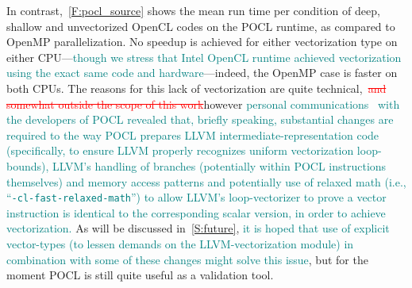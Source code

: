 \documentclass[12pt,number,sort&compress,preprint]{elsarticle}
\newcommand{\add}[1]{{\sloppy\textcolor{teal}{#1}}}  %
\newcommand{\delete}[1]{\sloppy\textcolor{red}{\sout{#1}}} %
\begin{document}
In contrast,~\cref{F:pocl_source} shows the mean run time per condition of deep, shallow and unvectorized OpenCL codes on the POCL runtime, as compared to OpenMP parallelization.
No speedup is achieved for either vectorization type on either CPU---\add{though we stress that Intel OpenCL runtime achieved vectorization using the exact same code and hardware}---indeed, the OpenMP case is faster on both CPUs.
The reasons for this lack of vectorization are quite technical,~\delete{and somewhat outside the scope of this work}however \add{personal communications~\cite{pocl_communication} with the developers of POCL revealed that, briefly speaking, substantial changes are required to the way POCL prepares LLVM intermediate-representation code (specifically, to ensure LLVM properly recognizes uniform vectorization loop-bounds), LLVM's handling of branches (potentially within POCL instructions themselves) and memory access patterns and potentially use of relaxed math (i.e., ``\texttt{-cl-fast-relaxed-math}'') to allow LLVM's loop-vectorizer to prove a vector instruction is identical to the corresponding scalar version, in order to achieve vectorization.}
As will be discussed in~\cref{S:future}, \add{it is hoped that use of explicit vector-types (to lessen demands on the LLVM-vectorization module) in combination with some of these changes might solve this issue}, but for the moment POCL is still quite useful as a validation tool.
\end{document}
